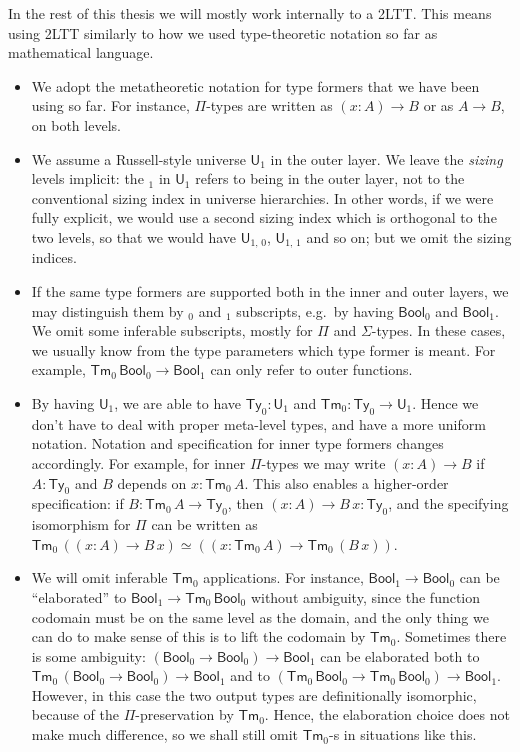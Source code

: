 \documentclass[12pt,a4paper,twoside,openany]{book}
\theoremstyle{remark}
\theoremstyle{definition}
\newcommand{\ms}[1]{\mathsf{#1}}
\newcommand{\Tm}{\mathsf{Tm}}
\newcommand{\Ty}{\mathsf{Ty}}
\newcommand{\U}{\mathsf{U}}
\newcommand{\Bool}{\ms{Bool}}
\begin{document}
In the rest of this thesis we will mostly work internally to a 2LTT. This means
using 2LTT similarly to how we used type-theoretic notation so far as
mathematical language.
\begin{itemize}
  \item
    We adopt the metatheoretic notation for type formers that we have been using
    so far. For instance, $\Pi$-types are written as $(x : A) \to B$ or as $A
    \to B$, on both levels.
  \item
    We assume a Russell-style universe $\U_1$ in the outer layer. We leave the
    \emph{sizing} levels implicit: the $_1$ in $\U_1$ refers to being in the
    outer layer, not to the conventional sizing index in universe
    hierarchies. In other words, if we were fully explicit, we would use a
    second sizing index which is orthogonal to the two levels, so that we would
    have $\U_{1,\,0}$, $\U_{1,\,1}$ and so on; but we omit the sizing indices.
  \item
    If the same type formers are supported both in the inner and outer layers, we
    may distinguish them by $_0$ and $_1$ subscripts, e.g.\ by having $\Bool_0$ and
    $\Bool_1$. We omit some inferable subscripts, mostly for $\Pi$ and
    $\Sigma$-types. In these cases, we usually know from the type parameters which
    type former is meant. For example, $\Tm_0\,\Bool_0 \to \Bool_1$ can only refer
    to outer functions.
  \item
    By having $\U_1$, we are able to have $\Ty_0 : \U_1$ and $\Tm_0 : \Ty_0 \to
    \U_1$.  Hence we don't have to deal with proper meta-level types, and have a
    more uniform notation. Notation and specification for inner type formers changes
    accordingly. For example, for inner $\Pi$-types we may write $(x : A) \to B$
    if $A : \Ty_0$ and $B$ depends on $x : \Tm_0\,A$. This also enables a
    higher-order specification: if $B : \Tm_0\,A \to \Ty_0$, then $(x : A) \to
    B\,x : \Ty_0$, and the specifying isomorphism for $\Pi$ can be written as
    $\Tm_0\,((x : A) \to B\,x) \simeq ((x : \Tm_0\,A) \to \Tm_0\,(B\,x))$.
  \item
    We will omit inferable $\Tm_0$ applications. For instance, $\Bool_1 \to
    \Bool_0$ can be ``elaborated'' to $\Bool_1 \to \Tm_0\,\Bool_0$ without
    ambiguity, since the function codomain must be on the same level as the
    domain, and the only thing we can do to make sense of this is to lift the
    codomain by $\Tm_0$. Sometimes there is some ambiguity: $(\Bool_0 \to
    \Bool_0) \to \Bool_1$ can be elaborated both to $\Tm_0\,(\Bool_0 \to
    \Bool_0) \to \Bool_1$ and to $(\Tm_0\,\Bool_0 \to \Tm_0\,\Bool_0) \to
    \Bool_1$. However, in this case the two output types are definitionally
    isomorphic, because of the $\Pi$-preservation by $\Tm_0$. Hence, the
    elaboration choice does not make much difference, so we shall still omit
    $\Tm_0$-s in situations like this.
\end{itemize}
\end{document}
